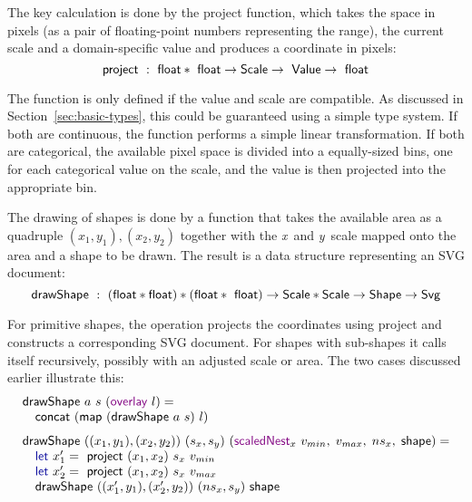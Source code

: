 \documentclass{jfp}
\newcommand{\X}{\emph{x}\ }
\newcommand{\Y}{\emph{y}\ }
\newcommand{\ident}[1]{\textnormal{\textcolor{idclr}{\sffamily #1}}}
\newcommand{\kvd}[1]{\textnormal{\textcolor{kvdclr}{\sffamily #1}}}
\newcommand{\fkvd}[1]{\textnormal{\textcolor{fkvdclr}{\sffamily #1}}}
\begin{document}
The key calculation is done by the \ident{project} function, which takes the space in pixels (as a
pair of floating-point numbers representing the range), the current scale and a domain-specific value
and produces a coordinate in pixels:
%
\begin{equation*}
\ident{project}~:~\ident{float}*\ident{float}\rightarrow \ident{Scale}\rightarrow\ident{Value} \rightarrow \ident{float}
\end{equation*}

\vspace{-1.25em}
\noindent
The function is only defined if the value and scale are compatible. As discussed in Section~\ref{sec:basic-types},
this could be guaranteed using a simple type system. If both are continuous, the
function performs a simple linear transformation. If both are categorical, the available pixel
space is divided into a equally-sized bins, one for each categorical value on the scale, and the
value is then projected into the appropriate bin.

The drawing of shapes is done by a function that takes the available area as a quadruple $(x_1, y_1), (x_2, y_2)$
together with the \X and \Y scale mapped onto the area and a shape to be drawn. The result is
a data structure representing an SVG document:
%
\begin{equation*}
\ident{drawShape}~:~(\ident{float}*\ident{float})*(\ident{float}*\ident{float}) \rightarrow \ident{Scale}*\ident{Scale}\rightarrow\ident{Shape}\rightarrow\ident{Svg}
\end{equation*}

\vspace{-1.25em}
\noindent
For primitive shapes, the operation projects the coordinates using \ident{project} and constructs
a corresponding SVG document. For shapes with sub-shapes it calls itself recursively, possibly
with an adjusted scale or area. The two cases discussed earlier illustrate this:
%
\begin{equation*}
\begin{array}{l}
\ident{drawShape}~a~s~(\kvd{overlay}~l) = \\
\quad\ident{concat}~(\ident{map}~(\ident{drawShape}~a~s)~l)\\
\\[-0.5em]
\ident{drawShape}~((x_1, y_1), (x_2, y_2))~(s_x, s_y)~(\kvd{scaledNest}_x~v_{min},\;v_{max},\;{ns}_x,\;\ident{shape}) = \\
\quad\fkvd{let}~x_1' = \ident{project}~(x_1, x_2)~s_x~v_{min}\\
\quad\fkvd{let}~x_2' = \ident{project}~(x_1, x_2)~s_x~v_{max}\\
\quad\ident{drawShape}~((x_1', y_1), (x_2', y_2))~({ns}_x, s_y)~\ident{shape}\\
\end{array}
\end{equation*}
\end{document}
